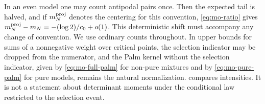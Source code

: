 \begin{remark}\label{rem:mo-counting}
In an even model one may count antipodal pairs once. Then the expected tail is halved, and if $m_N^{\rm proj}$ denotes the centering for this convention, \eqref{eq:mo-ratio} gives $m_N^{\rm proj}-m_N=-(\log2)/c_0+o(1)$. This deterministic shift must accompany any change of convention. We use ordinary counts throughout. In upper bounds for sums of a nonnegative weight over critical points, the selection indicator may be dropped from the numerator, and the Palm kernel without the selection indicator, given by \eqref{eq:mo-full-palm} for non-pure mixtures and by \eqref{eq:mo-pure-palm} for pure models, remains the natural normalization.  compares intensities. It is not a statement about determinant moments under the conditional law restricted to the selection event.
\end{remark}
